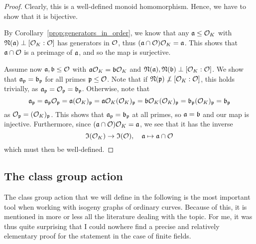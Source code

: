 \begin{proof}
    Clearly, this is a well-defined monoid homomorphism.
    Hence, we have to show that it is bijective.

    By Corollary~\ref{prop:generators_in_order}, we know that any $\a \leq \O_K$ with $\Norm(\a) \perp [\O_K : \O]$ has generators in $\O$, thus $(\a \cap \O)\O_K = \a$.
    This shows that $\a \cap \O$ is a preimage of $\a$, and so the map is surjective. 

    Assume now $\a, \b \leq \O$ with $\a\O_K = \b\O_K$ and $\Norm(\a), \Norm(\b) \perp [\O_K : \O]$.
    We show that $\a_\p = \b_\p$ for all primes $\p \leq \O$.
    Note that if $\Norm(\p) \not\perp [\O_K : \O]$, this holds trivially, as $\a_\p = \O_\p = \b_\p$.
    Otherwise, note that
    \begin{equation*}
        \a_\p = \a_\p \O_\p = \a (\O_K)_\p = \a\O_K(\O_K)_\p = \b\O_K(\O_K)_\p = \b_\p (\O_K)_\p = \b_\p
    \end{equation*}
    as $\O_\p = (\O_K)_\p$.
    This shows that $\a_\p = \b_\p$ at all primes, so $\a = \b$ and our map is injective.
    Furthermore, since $(\a \cap \O)\O_K = \a$, we see that it has the inverse
    \begin{equation*}
        \mathfrak{I}(\O_K) \to \mathfrak{I}(\O), \quad \a \mapsto \a \cap \O
    \end{equation*}
    which must then be well-defined.
\end{proof}

\subsection{The class group action}
The class group action that we will define in the following is the most important tool when working with isogeny graphs of ordinary curves.
Because of this, it is mentioned in more or less all the literature dealing with the topic.
For me, it was thus quite surprising that I could nowhere find a precise and relatively elementary proof for the statement in the case of finite fields.

